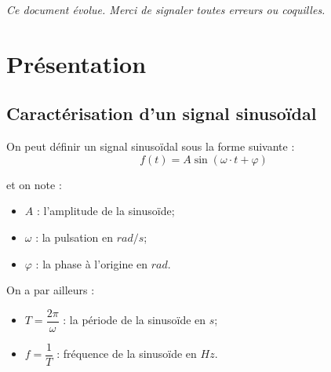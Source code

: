 \documentclass[10pt,oneside]{article}
\begin{document}
\setlength{\parskip}{0ex plus 0.2ex minus 0ex}
 \renewcommand{\contentsname}{}
 \renewcommand{\baselinestretch}{1}

\tableofcontents

 \renewcommand{\baselinestretch}{1.2}
\setlength{\parskip}{2ex plus 0.5ex minus 0.2ex}

\textit{Ce document évolue. Merci de signaler toutes erreurs ou coquilles.}



\section{Présentation}
\subsection{Caractérisation d'un signal sinusoïdal}

On peut définir un signal sinusoïdal sous la forme suivante :
$$
f(t)=A \sin(\omega \cdot t + \varphi)
$$
\begin{minipage}[c]{.45\linewidth}
et on note :
\begin{itemize}
\item $A$ : l'amplitude de la sinusoïde;
\item $\omega$ : la pulsation en $rad/s$;
\item $\varphi$ : la phase à l'origine en $rad$.
\end{itemize}
\end{minipage}\hfill
\begin{minipage}[c]{.45\linewidth}
On a par ailleurs :
\begin{itemize}
\item $T=\dfrac{2\pi}{\omega}$ : la période de la sinusoïde en $s$;
\item $f=\dfrac{1}{T}$ : fréquence de la sinusoïde en $Hz$.
\end{itemize}
\end{minipage}
\vspace{.5cm}
\end{document}
